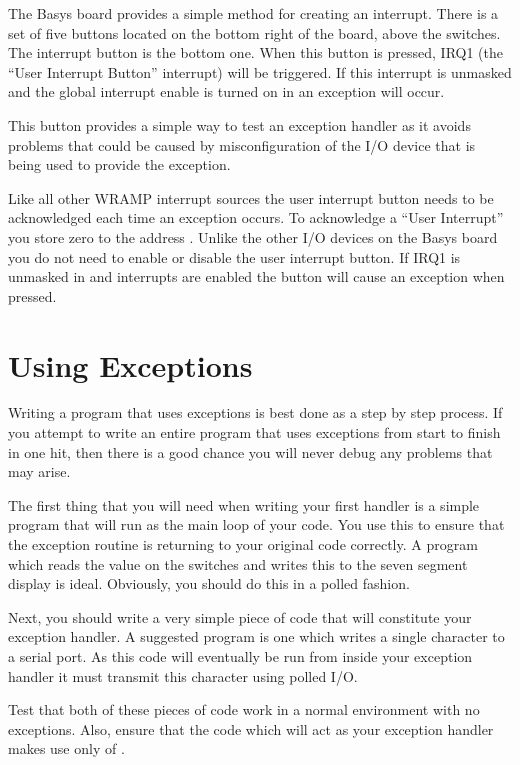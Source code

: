 The Basys board provides a simple method for creating an
interrupt. There is a set of five buttons located on the bottom right
of the board, above the switches. The interrupt button is the bottom
one. When this button is pressed, IRQ1 (the ``User Interrupt Button''
interrupt) will be triggered. If this interrupt is unmasked and the
global interrupt enable is turned on in  an exception
will occur.

This button provides a simple way to test an exception handler as it
avoids problems that could be caused by misconfiguration of the I/O
device that is being used to provide the exception.

Like all other WRAMP interrupt sources the user interrupt button needs
to be acknowledged each time an exception occurs. To acknowledge a
``User Interrupt'' you store zero to the address
. Unlike the other I/O devices on the Basys board you do
not need to enable or disable the user interrupt button. If IRQ1 is
unmasked in  and interrupts are enabled the button
will cause an exception when pressed.

\section{Using Exceptions}

Writing a program that uses exceptions is best done as a step by step
process. If you attempt to write an entire program that uses exceptions
from start to finish in one hit, then there is a good chance you will never
debug any problems that may arise.

The first thing that you will need when writing your first handler is a
simple program that will run as the main loop of your code. You use this to
ensure that the exception routine is returning to your original code
correctly. A program which reads the value on the switches and writes this
to the seven segment display is ideal. Obviously, you should do this in a
polled fashion.

Next, you should write a very simple piece of code that will constitute
your exception handler. A suggested program is one which writes a
single character to a serial port. As this code will eventually be run
from inside your exception handler it must transmit this character
using polled I/O.

Test that both of these pieces of code work in a normal environment with no
exceptions. Also, ensure that the code which will act as your exception
handler makes use only of .

